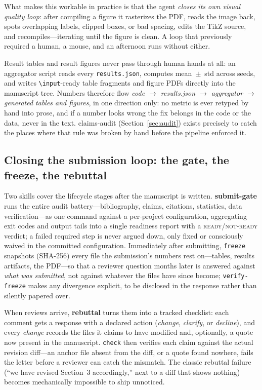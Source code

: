 \documentclass[11pt]{article}
\begin{document}
What makes this workable in practice is that the agent \emph{closes its own
visual quality loop}: after compiling a figure it rasterizes the PDF, reads
the image back, spots overlapping labels, clipped boxes, or bad spacing,
edits the TikZ source, and recompiles---iterating until the figure is clean.
A loop that previously required a human, a mouse, and an afternoon runs
without either.

Result tables and result figures never pass through human hands at all: an
aggregator script reads every \texttt{results.json}, computes
mean~$\pm$~std across seeds, and writes \texttt{\textbackslash input}-ready
table fragments and figure PDFs directly into the manuscript tree. Numbers
therefore flow \emph{code $\rightarrow$ results.json $\rightarrow$
aggregator $\rightarrow$ generated tables and figures}, in one direction
only: no metric is ever retyped by hand into prose, and if a number looks
wrong the fix belongs in the code or the data, never in the text.
claims-audit (Section~\ref{sec:audit}) exists precisely to catch the places
where that rule was broken by hand before the pipeline enforced it.

\subsection{Closing the submission loop: the gate, the freeze, the rebuttal}
\label{sec:submission}

Two skills cover the lifecycle stages after the manuscript is written.
\textbf{submit-gate} runs the entire audit battery---bibliography, claims,
citations, statistics, data verification---as one command against a
per-project configuration, aggregating exit codes and output tails into a
single readiness report with a \textsc{ready}/\textsc{not-ready} verdict; a
failed required step is never argued down, only fixed or consciously waived
in the committed configuration. Immediately after submitting, \texttt{freeze}
snapshots (SHA-256) every file the submission's numbers rest on---tables,
results artifacts, the PDF---so that a reviewer question months later is
answered against \emph{what was submitted}, not against whatever the files
have since become; \texttt{verify-freeze} makes any divergence explicit, to
be disclosed in the response rather than silently papered over.

When reviews arrive, \textbf{rebuttal} turns them into a tracked checklist:
each comment gets a response with a declared action (\emph{change},
\emph{clarify}, or \emph{decline}), and every \emph{change} records the files
it claims to have modified and, optionally, a quote now present in the
manuscript. \texttt{check} then verifies each claim against the actual
revision diff---an anchor file absent from the diff, or a quote found
nowhere, fails the letter before a reviewer can catch the mismatch. The
classic rebuttal failure (``we have revised Section~3 accordingly,'' next to
a diff that shows nothing) becomes mechanically impossible to ship unnoticed.
\end{document}
